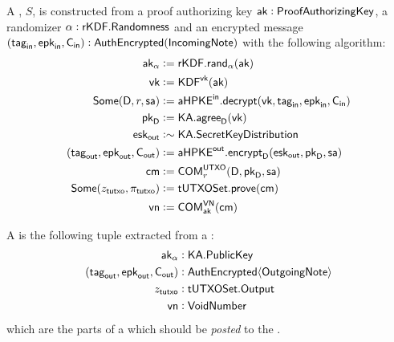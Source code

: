 \begin{definition}
    A \Sender{}, $S$, is constructed from a proof authorizing key $\ak : \ProofAuthorizingKey$, a randomizer $\alpha : \rKDF.\Randomness$ and an encrypted message $(\tagin, \epkin, \Cin) : \AuthEncrypted(\IncomingNote)$ with the following algorithm:
    \begin{align*}
        \ak_\alpha                   &:= \rKDF.\rand_\alpha(\ak) \\
        \vk                          &:= \KDF^\vk(\ak) \\
        \Some(\textsf{D}, r, \sa) &:= \aHPKEin.\decrypt(\vk, \tagin, \epkin, \Cin) \\
        \pkD                         &:= \KA.\agree_\textsf{D}(\vk) \\
        \eskout                      &:\sim \KA.\SecretKeyDistribution \\
        (\tagout, \epkout, \Cout)    &:= \aHPKEout.\encrypt_\textsf{D}(\eskout, \pkD, \sa) \\
        \cm                          &:= \COM^{\UTXO}_{r}(\textsf{D}, \pkD, \sa) \\
        \Some(z_\tutxo, \pi_\tutxo)        &:= \TUTXOSet.\prove(\cm) \\
        \vn                          &:= \COM^{\VN}_\ak(\cm)
    \end{align*}
\end{definition}

\begin{definition}
    A \SenderPost{} is the following tuple extracted from a \Sender{}:
    \begin{align*}
        \ak_\alpha                &: \KA.\PublicKey \\
        (\tagout, \epkout, \Cout) &: \AuthEncrypted\bra{\OutgoingNote} \\
        z_\tutxo                     &: \TUTXOSet.\Output \\
        \vn                       &: \VoidNumber
    \end{align*}
    which are the parts of a \Sender{} which should be \emph{posted} to the \Ledger{}.
\end{definition}


